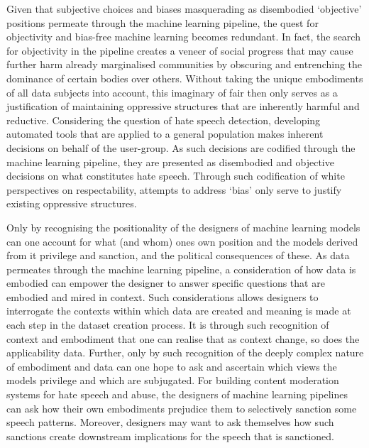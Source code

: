 Given that subjective choices and biases masquerading as disembodied `objective' positions permeate through the machine learning pipeline, the quest for objectivity and bias-free machine learning becomes redundant. In fact, the search for objectivity in the pipeline creates a veneer of social progress that may cause further harm already marginalised communities by obscuring and entrenching the dominance of certain bodies over others. Without taking the unique embodiments of all data subjects into account, this imaginary of fair then only serves as a justification of maintaining oppressive structures that are inherently harmful and reductive. Considering the question of hate speech detection, developing automated tools that are applied to a general population makes inherent decisions on behalf of the user-group. As such decisions are codified through the machine learning pipeline, they are presented as disembodied and objective decisions on what constitutes hate speech. Through such codification of white perspectives on respectability, attempts to address `bias' only serve to justify existing oppressive structures.

Only by recognising the positionality of the designers of machine learning models can one account for what (and whom) ones own position and the models derived from it privilege and sanction, and the political consequences of these. As data permeates through the machine learning pipeline, a consideration of how data is embodied can empower the designer to answer specific questions that are embodied and mired in context. Such considerations allows designers to interrogate the contexts within which data are created and meaning is made at each step in the dataset creation process. It is through such recognition of context and embodiment that one can realise that as context change, so does the applicability data. 
Further, only by such recognition of the deeply complex nature of embodiment and data can one hope to ask and ascertain which views the models privilege and which are subjugated. For building content moderation systems for hate speech and abuse, the designers of machine learning pipelines can ask how their own embodiments prejudice them to selectively sanction some speech patterns. Moreover, designers may want to ask themselves how such sanctions create downstream implications for the speech that is sanctioned.

